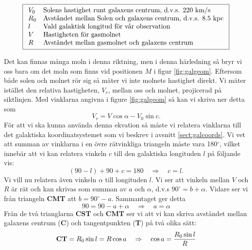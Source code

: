 \begin{displaymath}
	\boxed{
\begin{array}{ll}
	V_0 	&\hbox{Solens hastighet runt galaxens centrum, d.v.s. 220 km/s}					\\
    R_0	&\hbox{Avståndet mellan Solen och galaxens centrum, d.v.s. 8.5 kpc} 					\\
l	&\hbox{Vald galaktisk longitud för vår observation}				\\
V	&\hbox{Hastigheten för gasmolnet}			\\
R	&\hbox{Avståndet mellan gasmolnet och galaxens centrum}		\\
\end{array}
}
\end{displaymath}

Det kan finnas många moln i denna riktning, men i denna härledning så bryr vi oss
bara om det moln som finns vid positionen $M$ i figur \ref{fig:galgeom}. Eftersom
både solen och molnet rör sig så mäter vi inte molnets hastighet direkt. Vi mäter
istället den relativa hastigheten, $V_r$, mellan oss och molnet, projicerad på
siktlinjen. Med vinklarna angivna i figure \ref{fig:galgeom} så kan vi 
skriva ner detta som  
\begin{equation}
V_r = V \cos\alpha - V_0 \sin c .
\label{eqn:vrel1}
\end{equation}
För att vi ska kunna använda denna ekvation så måste vi relatera vinklarna till
det galaktiska koordinatsystemet som vi beskrev i avsnitt \ref{sect:galcoords}.
Vi vet att summan av vinklarna i en övre rätvinkliga triangeln måste vara
180$^\circ$, vilket innebär att vi kan relatera vinkeln $c$ till den galaktiska
longituden $l$ på följande vis:
\begin{equation}
(90-l)+90+c=180 \quad \Rightarrow \quad c=l.
\label{eqn:c}
\end{equation}
Vi vill nu relatera även vinkeln $\alpha$ till longituden $l$. Vi ser att vinkeln 
mellan $V$ och $R$ är rät och kan skrivas som summan av $a$ och $\alpha$, d.v.s
$90^\circ = b + \alpha$. Vidare ser vi från triangeln {\bf CMT} att $b = 90^\circ - a$.
Sammantaget ger detta 
\begin{equation}
    90 = 90-a+\alpha \quad \Rightarrow \quad a = \alpha
\label{eqn:a}
\end{equation}
Från de två trianglarna {\bf CST} och {\bf CMT} ser vi att vi kan skriva
avståndet mellan galaxens centrum ({\bf C}) och tangentpunkten ({\bf T}) på två
olika sätt:
\begin{equation}
	{\rm\bf CT} = R_0\sin l = R \cos a \quad \Rightarrow \quad \cos a = \frac{R_0\sin l}{R}
\label{eqn:cosalpha}
\end{equation}
